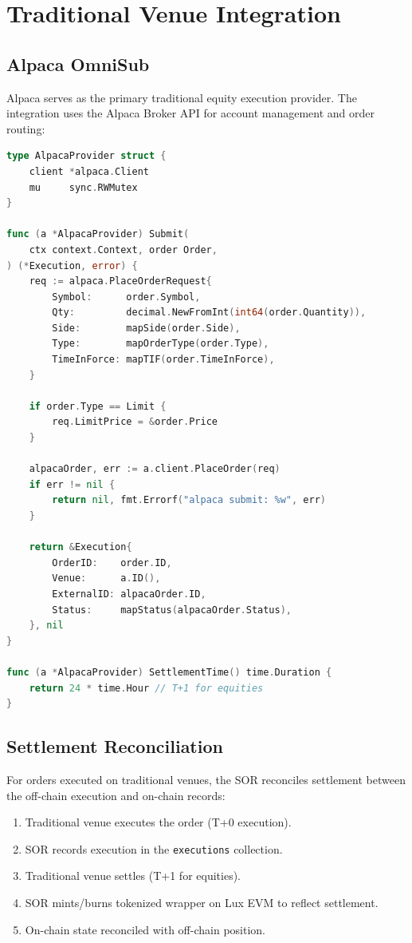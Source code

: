\section{Traditional Venue Integration}
\label{sec:traditional}

\subsection{Alpaca OmniSub}

Alpaca serves as the primary traditional equity execution provider. The integration uses the Alpaca Broker API for account management and order routing:

\begin{lstlisting}[language=Go,caption={Alpaca provider implementation.}]
type AlpacaProvider struct {
    client *alpaca.Client
    mu     sync.RWMutex
}

func (a *AlpacaProvider) Submit(
    ctx context.Context, order Order,
) (*Execution, error) {
    req := alpaca.PlaceOrderRequest{
        Symbol:      order.Symbol,
        Qty:         decimal.NewFromInt(int64(order.Quantity)),
        Side:        mapSide(order.Side),
        Type:        mapOrderType(order.Type),
        TimeInForce: mapTIF(order.TimeInForce),
    }

    if order.Type == Limit {
        req.LimitPrice = &order.Price
    }

    alpacaOrder, err := a.client.PlaceOrder(req)
    if err != nil {
        return nil, fmt.Errorf("alpaca submit: %w", err)
    }

    return &Execution{
        OrderID:    order.ID,
        Venue:      a.ID(),
        ExternalID: alpacaOrder.ID,
        Status:     mapStatus(alpacaOrder.Status),
    }, nil
}

func (a *AlpacaProvider) SettlementTime() time.Duration {
    return 24 * time.Hour // T+1 for equities
}
\end{lstlisting}

\subsection{Settlement Reconciliation}

For orders executed on traditional venues, the SOR reconciles settlement between the off-chain execution and on-chain records:

\begin{enumerate}[nosep]
  \item Traditional venue executes the order (T+0 execution).
  \item SOR records execution in the \texttt{executions} collection.
  \item Traditional venue settles (T+1 for equities).
  \item SOR mints/burns tokenized wrapper on Lux EVM to reflect settlement.
  \item On-chain state reconciled with off-chain position.
\end{enumerate}

